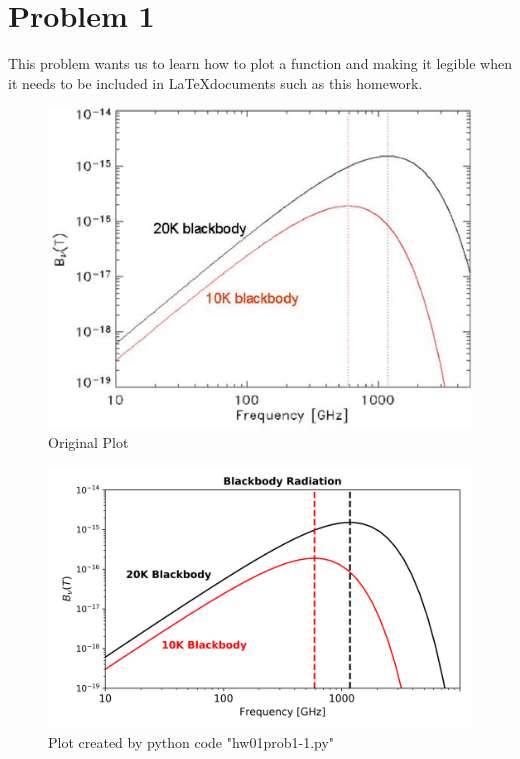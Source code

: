 \section*{Problem 1}

This problem wants us to learn how to plot a function and making it legible when it needs to be included in \LaTeX documents such as this homework. 

\begin{figure}[t]
    \centering
    \includegraphics[scale=1]{figures/planck.eps}
    \caption{Original Plot}
    \label{fig:grantOriginalPlot}
\end{figure}

\begin{figure}[t]
    \centering
    \includegraphics[scale=1]{figures/hw01prob1-1.png}
    \caption{Plot created by python code "hw01prob1-1.py"}
    \label{fig:blackbodyRadiationPlot}
\end{figure}

